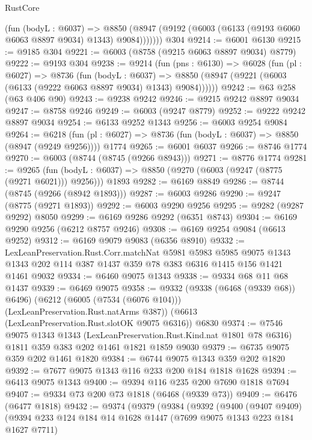 \begin{lexlean}{RustCore}
\begin{coremodule}
{\begin{coremodule}
{{{{{{{{{{{{{{{{{{{{{{{{{{{{{{{{{{{{{{{{{{{{{{{          (fun (bodyL : @6037) =>
          @8850 (@8947 (@9192 (@6003 (@6133 (@9193 @6060 @6063 @8897 @9034) @1343) @9084)))))))
    @304
@9214 := @6001 @6130
@9215 := @9185 @304
@9221 := @6003 (@8758 (@9215 @6063 @8897 @9034) @8779)
@9222 := @9193 @304
@9238 := @9214
    (fun (pns : @6130) =>
    @6028
      (fun (pl : @6027) =>
      @8736
        (fun (bodyL : @6037) =>
        @8850 (@8947 (@9221 (@6003 (@6133 (@9222 @6063 @8897 @9034) @1343) @9084))))))
@9242 := @63 @258 (@63 @406 @90)
@9243 := @9238 @9242
@9246 := @9215 @9242 @8897 @9034
@9247 := @8758 @9246
@9249 := @6003 (@9247 @8779)
@9252 := @9222 @9242 @8897 @9034
@9254 := @6133 @9252 @1343
@9256 := @6003 @9254 @9084
@9264 := @6218
    (fun (pl : @6027) => @8736 (fun (bodyL : @6037) => @8850 (@8947 (@9249 @9256))))
    @1774
@9265 := @6001 @6037
@9266 := @8746 @1774
@9270 := @6003 (@8744 (@8745 (@9266 @8943)))
@9271 := @8776 @1774
@9281 := @9265
    (fun (bodyL : @6037) => @8850 (@9270 (@6003 (@9247 (@8775 (@9271 @6021))) @9256)))
    @1893
@9282 := @6169 @8849
@9286 := @8744 (@8745 (@9266 (@8942 @1893)))
@9287 := @6003 @9286
@9290 := @9247 (@8775 (@9271 @1893))
@9292 := @6003 @9290 @9256
@9295 := @9282 (@9287 @9292) @8050
@9299 := @6169 @9286 @9292 (@6351 @8743)
@9304 := @6169 @9290 @9256 (@6212 @8757 @9246)
@9308 := @6169 @9254 @9084 (@6613 @9252)
@9312 := @6169 @9079 @9083 (@6356 @8910)
@9332 := LexLeanPreservation.Rust.Corr.matchNat
    @5981
    @5983
    @5985
    @9075
    @1343
    @1343
    @202
    @114
    @387
    @1437
    @359
    @78
    @383
    @6316
    @1415
    @156
    @1421
    @1461
    @9032
@9334 := @6460 @9075 @1343
@9338 := @9334 @68 @11 @68 @1437
@9339 := @6469 @9075
@9358 := @9332
    (@9338 (@6468 (@9339 @68)) @6496)
    (@6212 (@6005 (@7534 (@6076 @104))) (LexLeanPreservation.Rust.natArms @387))
    (@6613 (LexLeanPreservation.Rust.slotOK @9075 @6316))
    @6830
@9374 := @7546
    @9075
    @1343
    @1343
    (LexLeanPreservation.Rust.Kind.nat @1801 @78 @6316)
    @1811
    @359
    @383
    @202
    @1461
    @1821
    @1859
    @9030
@9379 := @6735 @9075 @359 @202 @1461 @1820
@9384 := @6744 @9075 @1343 @359 @202 @1820
@9392 := @7677 @9075 @1343 @116 @233 @200 @184 @1818 @1628
@9394 := @6413 @9075 @1343
@9400 := @9394 @116 @235 @200 @7690 @1818 @7694
@9407 := @9334 @73 @200 @73 @1818 (@6468 (@9339 @73))
@9409 := @6476 (@6477 @1818)
@9432 := @9374
    (@9379
      (@9384
        (@9392
          (@9400
            (@9407 @9409)
            (@9394
              @233
              @124
              @184
              @14
              @1628
              @1447
              (@7699 @9075 @1343 @223 @184 @1627 @7711)
}}}}}}}}}}}}}}}}}}}}}}}}}}}}}}}}}}}}}}}}}}}}}}}
\end{coremodule}}
\end{coremodule}
\end{lexlean}
